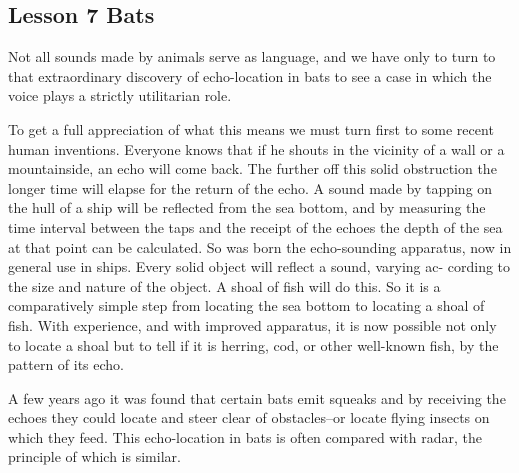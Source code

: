 \documentclass[kindlepaper]{BHCexam4kindle}
\begin{document}
\subsection{Lesson 7
Bats}
\par
Not all sounds made by animals serve as language, and we have only to turn to
that extraordinary discovery of echo-location in bats to see a case in which the
voice plays a strictly utilitarian role.
\par
To get a full appreciation of what this means we must turn first to some recent
human inventions. Everyone knows that if he shouts in the vicinity of a wall or
a mountainside, an echo will come back. The further off this solid obstruction
the longer time will elapse for the return of the echo. A sound made by tapping
on the hull of a ship will be reflected from the sea bottom, and by measuring the
time interval between the taps and the receipt of the echoes the depth of the
sea at that point can be calculated. So was born the echo-sounding apparatus,
now in general use in ships. Every solid object will reflect a sound, varying ac-
cording to the size and nature of the object. A shoal of fish will do this. So it is a
comparatively simple step from locating the sea bottom to locating a shoal of
fish. With experience, and with improved apparatus, it is now possible not only
to locate a shoal but to tell if it is herring, cod, or other well-known fish, by the
pattern of its echo.
\par
A few years ago it was found that certain bats emit squeaks and by receiving
the echoes they could locate and steer clear of obstacles--or locate flying insects
on which they feed. This echo-location in bats is often compared with radar, the
principle of which is similar.
\clearpage
\end{document}
